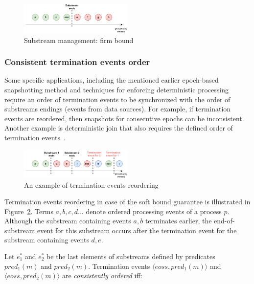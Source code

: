 \begin{figure}[htbp]
  \centering
  \includegraphics[width=0.50\textwidth]{pics/strict-guarantee.pdf}
  \caption{Substream management: firm bound}
  \label{strict_guarantees}
\end{figure}

\subsubsection{Consistent termination events order}
Some specific applications, including the mentioned earlier epoch-based snapshotting method and techniques for enforcing deterministic processing~\cite{we2018adbis} require an order of termination events to be synchronized with the order of substreams endings (events from data sources). For example, if termination events are reordered, then snapshots for consecutive epochs can be inconsistent. Another example is deterministic join that also requires the defined order of termination events~\cite{gulisano2016scalejoin}.

\begin{figure}[htbp]
  \centering
  \includegraphics[width=0.50\textwidth]{pics/notifications-reordering.pdf}
  \caption{An example of termination events reordering}
  \label{notifications_reordering}
\end{figure}

Termination events reordering in case of the soft bound guarantee is illustrated in Figure~\ref{notifications_reordering}. Terms $a,b,c,d...$ denote ordered processing events of a process $p$. Although the substream containing events $a,b$ terminates earlier, the end-of-substream event for this substream occurs after the termination event for the substream containing events $d,e$. 

Let $e^{*}_1$ and $e^{*}_2$ be the last elements of substreams defined by predicates $pred_1(m)$ and $pred_2(m)$. Termination events $\langle eoss, pred_1(m)\rangle$ and $\langle eoss, pred_2(m)\rangle$ are {\em consistently ordered} iff:

